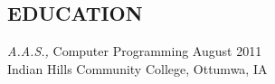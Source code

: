 \documentclass[line,margin]{res}
\begin{document}
\begin{resume}
\section{EDUCATION} {\sl A.A.S.,} Computer Programming \hfill August 2011 \\
Indian Hills Community College, Ottumwa, IA

\end{resume}
\end{document}
